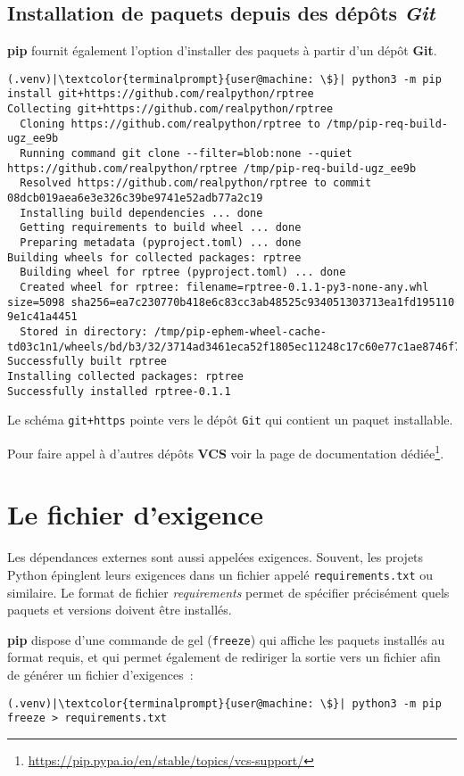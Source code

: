 \subsection*{Installation de paquets depuis des dépôts \textit{Git}}
\textbf{pip} fournit également l’option d’installer des paquets à partir d’un dépôt \textbf{Git}. 
\begin{lstlisting}[style=terminal]
(.venv)|\textcolor{terminalprompt}{user@machine: \$}| python3 -m pip install git+https://github.com/realpython/rptree
Collecting git+https://github.com/realpython/rptree
  Cloning https://github.com/realpython/rptree to /tmp/pip-req-build-ugz_ee9b
  Running command git clone --filter=blob:none --quiet https://github.com/realpython/rptree /tmp/pip-req-build-ugz_ee9b
  Resolved https://github.com/realpython/rptree to commit 08dcb019aea6e3e326c39be9741e52adb77a2c19
  Installing build dependencies ... done
  Getting requirements to build wheel ... done
  Preparing metadata (pyproject.toml) ... done
Building wheels for collected packages: rptree
  Building wheel for rptree (pyproject.toml) ... done
  Created wheel for rptree: filename=rptree-0.1.1-py3-none-any.whl size=5098 sha256=ea7c230770b418e6c83cc3ab48525c934051303713ea1fd195110 9e1c41a4451
  Stored in directory: /tmp/pip-ephem-wheel-cache-td03c1n1/wheels/bd/b3/32/3714ad3461eca52f1805ec11248c17c60e77c1ae8746f79179
Successfully built rptree
Installing collected packages: rptree
Successfully installed rptree-0.1.1
\end{lstlisting}

Le schéma \texttt{git+https} pointe vers le dépôt \texttt{Git} qui contient un paquet installable.

Pour faire appel à d'autres dépôts \textbf{VCS} voir la page de documentation dédiée\footnote{\url{https://pip.pypa.io/en/stable/topics/vcs-support/}}.

\section{Le fichier d'exigence}
Les dépendances externes sont aussi appelées exigences. Souvent, les projets Python épinglent leurs exigences dans un fichier appelé \texttt{requirements.txt} ou similaire. Le format de fichier \textit{requirements} permet de spécifier précisément quels paquets et versions doivent être installés.

\textbf{pip} dispose d'une commande de gel (\texttt{freeze}) qui affiche les paquets installés au format requis, et qui permet également de rediriger la sortie vers un fichier afin de générer un fichier d’exigences :
\begin{lstlisting}[style=terminal]
(.venv)|\textcolor{terminalprompt}{user@machine: \$}| python3 -m pip freeze > requirements.txt
\end{lstlisting}

